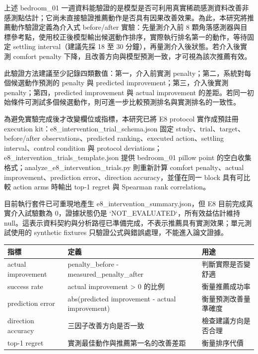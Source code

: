 \documentclass[12pt,a4paper]{article}
\begin{document}
上述 bedroom\_\allowbreak{}01 一週資料能驗證的是模型是否可利用真實稀疏感測資料改善非感測點估計；它尚未直接驗證推薦動作是否具有因果改善效果。為此，本研究將推薦動作驗證定義為介入式 before/after 實驗：先量測介入前 8 顆角落感測器與目標參考點，使用校正後模型輸出候選動作排序，實際執行排名第一的動作，等待固定 settling interval（建議先採 18 至 30 分鐘），再量測介入後狀態。若介入後實測 comfort penalty 下降，且改善方向與模型預測一致，才可視為該次推薦有效。


此驗證方法建議至少記錄四類數值：第一，介入前實測 penalty；第二，系統對每個候選動作預測的 penalty 與 predicted improvement；第三，介入後實測 penalty；第四，predicted improvement 與 actual improvement 的差距。若同一初始條件可測試多個候選動作，則可進一步比較預測排名與實測排名的一致性。


為避免實驗完成後才改變欄位或指標，本研究已將 E8 protocol 實作成預註冊 execution kit：e8\_\allowbreak{}intervention\_\allowbreak{}trial\_\allowbreak{}schema.json 固定 study、trial、target、before/after observations、predicted ranking、executed action、settling interval、control condition 與 protocol deviations；e8\_\allowbreak{}intervention\_\allowbreak{}trials\_\allowbreak{}template.json 提供 bedroom\_\allowbreak{}01 pillow point 的空白收集格式；analyze\_\allowbreak{}e8\_\allowbreak{}intervention\_\allowbreak{}trials.py 則重新計算 comfort penalty、actual improvement、prediction error、direction accuracy，並僅在同一 block 具有可比較 action arms 時輸出 top-1 regret 與 Spearman rank correlation。


目前執行套件已可重現地產生 e8\_\allowbreak{}intervention\_\allowbreak{}summary.json，但 E8 目前完成真實介入試驗數為 0，證據狀態仍是 `NOT\_\allowbreak{}EVALUATED`，所有效益估計維持 null。這表示資料契約與分析路徑已準備完成，不表示推薦具有實測效果；單元測試使用的 synthetic fixtures 只驗證公式與錯誤處理，不能進入論文證據。


\begin{table}[htbp]
\centering
\footnotesize
\renewcommand{\arraystretch}{1.25}
\begin{tabular}{|>{\raggedright\arraybackslash}p{}|>{\raggedright\arraybackslash}p{}|>{\raggedright\arraybackslash}p{}|}
\hline
\textbf{指標} & \textbf{定義} & \textbf{用途} \\
\hline
actual improvement & penalty\_\allowbreak{}before - measured\_\allowbreak{}penalty\_\allowbreak{}after & 判斷實際是否變舒適 \\
\hline
success rate & actual improvement > 0 的比例 & 衡量推薦成功率 \\
\hline
prediction error & abs(predicted improvement - actual improvement) & 衡量預測改善量準確度 \\
\hline
direction accuracy & 三因子改善方向是否一致 & 檢查建議方向是否合理 \\
\hline
top-1 regret & 實測最佳動作與推薦第一名的改善差距 & 衡量排序代價 \\
\hline
\end{tabular}
\end{table}
\end{document}
